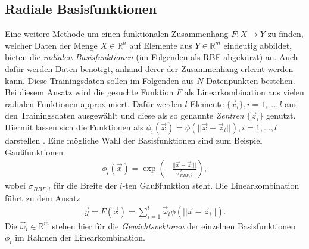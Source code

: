 \subsection{Radiale Basisfunktionen}
Eine weitere Methode um einen funktionalen Zusammenhang $F : X \rightarrow Y$ zu finden, welcher Daten der Menge $X \in \mathbb{R}^n$ auf Elemente aus $Y \in \mathbb{R}^m$ eindeutig abbildet, bieten die \textit{radialen Basisfunktionen} (im Folgenden als \textsc{RBF} abgekürzt) an. Auch dafür werden Daten benötigt, anhand derer der Zusammenhang erlernt werden kann. Diese Trainingsdaten sollen im Folgenden aus $N$ Datenpunkten bestehen.\\

Bei diesem Ansatz wird die gesuchte Funktion $F$ als Linearkombination aus vielen radialen Funktionen approximiert. Dafür werden $l$ Elemente $\{\vec{x}_i\}, i=1,...,l$ aus den Trainingsdaten ausgewählt und diese als so genannte \textit{Zentren} $\{\vec{z}_i\}$ genutzt. Hiermit lassen sich die Funktionen als $\phi_i(\vec{x}) = \phi(||\vec{x}-\vec{z}_i||), i=1,\ldots ,l$ darstellen \citep{lowe2multi}. Eine mögliche Wahl der Basisfunktionen sind zum Beispiel Gaußfunktionen
\begin{align*}
\phi_i(\vec{x}) = \exp \left( - \frac{||\vec{x}-\vec{z}_i||}{\sigma_{RBF, i}^2} \right),
\end{align*}
wobei $\sigma_{RBF, i}$ für die Breite der $i$-ten Gaußfunktion steht.
Die Linearkombination führt zu dem Ansatz 
\begin{align}
\label{eq:rbf_lincomb}
\vec{y} = F(\vec{x}) = \sum^l_{i=1} \vec{\omega}_i \phi(||\vec{x} - \vec{z}_i||).
\end{align}
Die $\vec{\omega}_i \in \mathbb{R}^m$ stehen hier für die \textit{Gewichtsvektoren} der einzelnen Basisfunktionen $\phi_i$ im Rahmen der Linearkombination.\\

